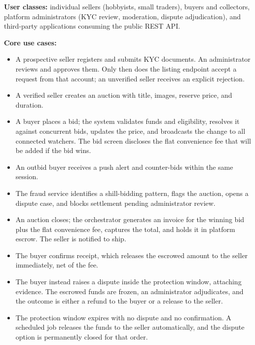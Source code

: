 \documentclass[11pt, a4paper]{article}
\newcommand{\secgap}{\vspace{0.06in}}
\begin{document}
\noindent\textbf{User classes:} individual sellers (hobbyists, small traders), buyers and
collectors, platform administrators (KYC review, moderation, dispute adjudication), and
third-party applications consuming the public REST API.

\medskip
\noindent\textbf{Core use cases:}
\begin{itemize}
    \item A prospective seller registers and submits KYC documents. An administrator
          reviews and approves them. Only then does the listing endpoint accept a request
          from that account; an unverified seller receives an explicit rejection.
    \item A verified seller creates an auction with title, images, reserve price, and
          duration.
    \item A buyer places a bid; the system validates funds and eligibility, resolves it
          against concurrent bids, updates the price, and broadcasts the change to all
          connected watchers. The bid screen discloses the flat convenience fee that will
          be added if the bid wins.
    \item An outbid buyer receives a push alert and counter-bids within the same session.
    \item The fraud service identifies a shill-bidding pattern, flags the auction, opens a
          dispute case, and blocks settlement pending administrator review.
    \item An auction closes; the orchestrator generates an invoice for the winning bid plus
          the flat convenience fee, captures the total, and holds it in platform escrow.
          The seller is notified to ship.
    \item The buyer confirms receipt, which releases the escrowed amount to the seller
          immediately, net of the fee.
    \item The buyer instead raises a dispute inside the protection window, attaching
          evidence. The escrowed funds are frozen, an administrator adjudicates, and the
          outcome is either a refund to the buyer or a release to the seller.
    \item The protection window expires with no dispute and no confirmation. A scheduled
          job releases the funds to the seller automatically, and the dispute option is
          permanently closed for that order.
\end{itemize}

\secgap
\end{document}
